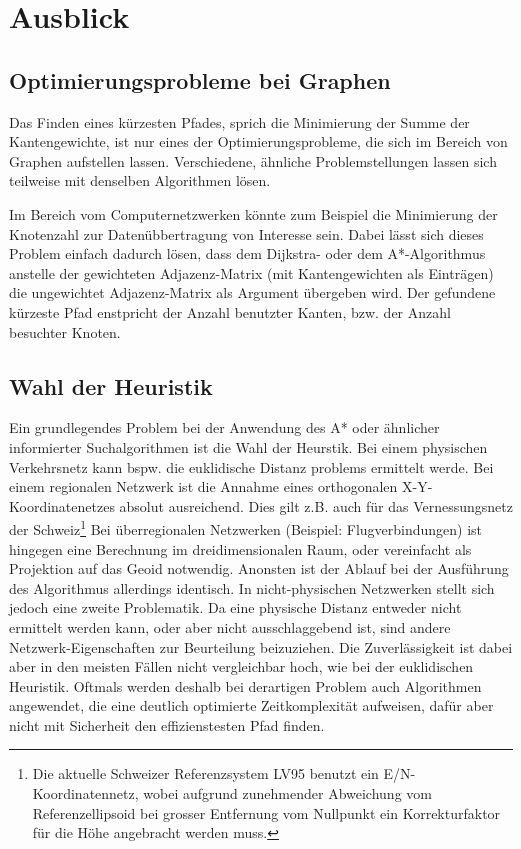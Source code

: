 \section{Ausblick}
\subsection{Optimierungsprobleme bei Graphen}
Das Finden eines kürzesten Pfades, sprich die Minimierung der Summe der Kantengewichte, ist nur eines der Optimierungsprobleme, die sich im Bereich von Graphen aufstellen lassen. Verschiedene, ähnliche Problemstellungen lassen sich teilweise mit denselben Algorithmen lösen.

Im Bereich vom Computernetzwerken könnte zum Beispiel die Minimierung der Knotenzahl zur Datenübbertragung von Interesse sein. Dabei lässt sich dieses Problem einfach dadurch lösen, dass dem Dijkstra- oder dem A*-Algorithmus anstelle der gewichteten Adjazenz-Matrix (mit Kantengewichten als Einträgen) die ungewichtet Adjazenz-Matrix als Argument übergeben wird. Der gefundene kürzeste Pfad enstpricht der Anzahl benutzter Kanten, bzw. der Anzahl besuchter Knoten.  

\subsection{Wahl der Heuristik}
Ein grundlegendes Problem bei der Anwendung des A* oder ähnlicher informierter Suchalgorithmen ist die Wahl der Heurstik. Bei einem physischen Verkehrsnetz kann bspw. die euklidische Distanz problems ermittelt werde. Bei einem regionalen Netzwerk ist die Annahme eines orthogonalen X-Y-Koordinatenetzes absolut ausreichend. Dies gilt z.B. auch für das Vernessungsnetz der Schweiz\footnote{Die aktuelle Schweizer Referenzsystem LV95 benutzt ein E/N-Koordinatennetz, wobei aufgrund zunehmender Abweichung vom Referenzellipsoid bei grosser Entfernung vom Nullpunkt ein Korrekturfaktor für die Höhe angebracht werden muss.} Bei überregionalen Netzwerken (Beispiel: Flugverbindungen) ist hingegen eine Berechnung im dreidimensionalen Raum, oder vereinfacht als Projektion auf das Geoid notwendig. Anonsten ist der Ablauf bei der Ausführung des Algorithmus allerdings identisch.
In nicht-physischen Netzwerken stellt sich jedoch eine zweite Problematik. Da eine physische Distanz entweder nicht ermittelt werden kann, oder aber nicht ausschlaggebend ist, sind andere Netzwerk-Eigenschaften zur Beurteilung beizuziehen. Die Zuverlässigkeit ist dabei aber in den meisten Fällen nicht vergleichbar hoch, wie bei der euklidischen Heuristik. Oftmals werden deshalb bei derartigen Problem auch Algorithmen angewendet, die eine deutlich optimierte Zeitkomplexität aufweisen, dafür aber nicht mit Sicherheit den effizienstesten Pfad finden.
